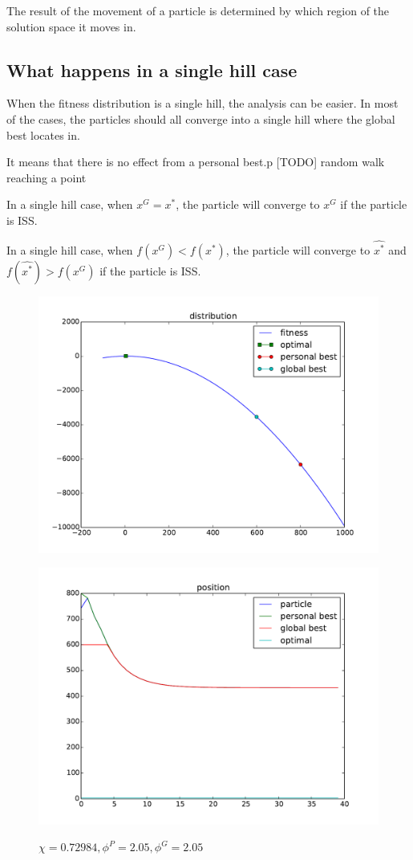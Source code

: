 The result of the movement of a particle is determined by which region of the solution space it moves in.

\subsection{What happens in a single hill case}

When the fitness distribution is a single hill, the analysis can be easier.
In most of the cases, the particles should all converge into a single hill where the global best locates in.



It means that there is no effect from a personal best.p
[TODO] random walk reaching a point


\begin{mylem}
In a single hill case, when $ x^{G} = x^{*} $, the particle will converge to $ x^{G} $ if the particle is ISS.
\end{mylem}

\begin{mylem}
In a single hill case, when $ f( x^{G} ) < f( x^{*}) $, the particle will converge to $ \hat{x^{*}} $ and $ f(\hat{x^{*}}) > f(x^{G}) $ if the particle is ISS.
\end{mylem}

\begin{figure}[ht]
\centering
\includegraphics[width=.7\linewidth]{./simfig/case1/distribution1}
\label{fig:case1-1:distribution} 
\end{figure}

\begin{figure}[ht]
\centering
\includegraphics[width=.7\linewidth]{./simfig/case1/position1-1} 
\label{fig:case1-1:position}
\caption{$ \chi = 0.72984 , \phi^{P} = 2.05 , \phi^{G} = 2.05 $ }
\end{figure}

